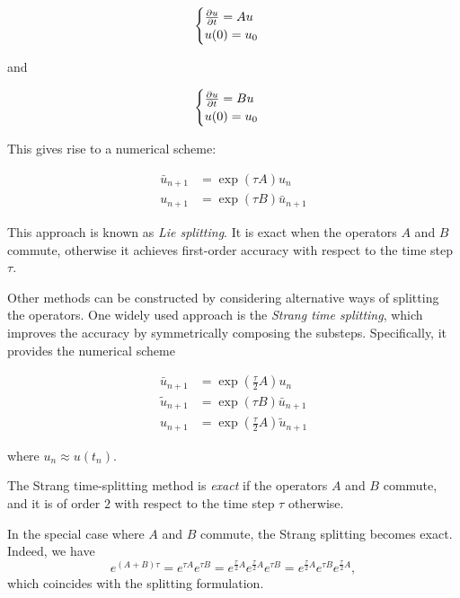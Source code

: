 \[
    \begin{cases}
        \frac{\partial u}{\partial t} = A u \\
        u(0) = u_0
    \end{cases}
    \label{eq:subproblemA}
\]

and

\[
    \begin{cases}
        \frac{\partial u}{\partial t} = B u \\
        u(0) = u_0
    \end{cases} 
\]

This gives rise to a numerical scheme:

\[
    \begin{aligned}
        \bar{u}_{n+1} &= \exp(\tau A)u_n \\
        u_{n+1} &= \exp(\tau B)\bar{u}_{n+1}
    \end{aligned}
\]

This approach is known as \emph{Lie splitting}. It is exact when the operators $A$ and $B$ commute, otherwise it achieves first-order accuracy with respect to the time step $\tau$.

Other methods can be constructed by considering alternative ways of splitting the operators. One widely used approach is the \emph{Strang time splitting}, which improves the accuracy by symmetrically composing the substeps. Specifically, it provides the numerical scheme

\begin{equation}
    \begin{aligned}
        \bar{u}_{n+1} &= \exp\left(\frac\tau2 A\right)u_n \\
        \tilde{u}_{n+1} &= \exp(\tau B)\bar{u}_{n+1} \\
        u_{n+1} &= \exp\left(\frac\tau2 A\right)\tilde{u}_{n+1}
    \end{aligned}
\end{equation}

where $u_n \approx u(t_n)$.

\begin{proposition}
    The Strang time-splitting method is \emph{exact} if the operators $A$ and $B$ commute, and it is of order $2$ with respect to the time step $\tau$ otherwise.
\end{proposition}

\begin{remark}
    In the special case where $A$ and $B$ commute, the Strang splitting becomes exact. Indeed, we have
    \[
        e^{(A+B)\tau} = e^{\tau A} e^{\tau B} 
        = e^{\frac{\tau}{2} A} e^{\frac{\tau}{2} A} e^{\tau B} 
        = e^{\frac{\tau}{2} A} e^{\tau B} e^{\frac{\tau}{2} A},
    \]
    which coincides with the splitting formulation.
\end{remark}

